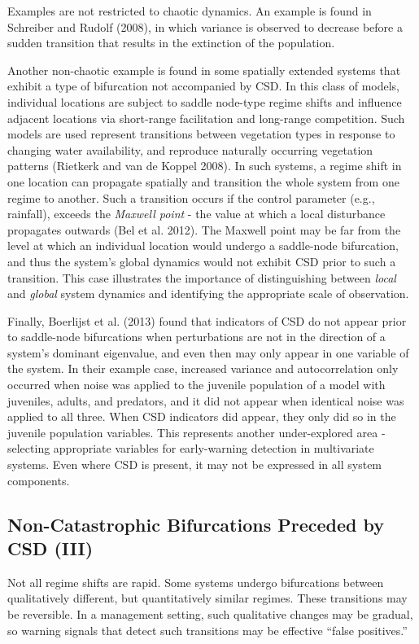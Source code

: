 \documentclass{article}
\begin{document}
Examples are not restricted to chaotic dynamics. An example is found in
Schreiber and Rudolf (2008), in which variance is observed to decrease
before a sudden transition that results in the extinction of the
population.

Another non-chaotic example is found in some spatially extended systems
that exhibit a type of bifurcation not accompanied by CSD. In this class
of models, individual locations are subject to saddle node-type regime
shifts and influence adjacent locations via short-range facilitation and
long-range competition. Such models are used represent transitions
between vegetation types in response to changing water availability, and
reproduce naturally occurring vegetation patterns (Rietkerk and van de
Koppel 2008). In such systems, a regime shift in one location can
propagate spatially and transition the whole system from one regime to
another. Such a transition occurs if the control parameter (e.g.,
rainfall), exceeds the \emph{Maxwell point} - the value at which a local
disturbance propagates outwards (Bel et al. 2012). The Maxwell point may
be far from the level at which an individual location would undergo a
saddle-node bifurcation, and thus the system's global dynamics would not
exhibit CSD prior to such a transition. This case illustrates the
importance of distinguishing between \emph{local} and \emph{global}
system dynamics and identifying the appropriate scale of observation.

Finally, Boerlijst et al. (2013) found that indicators of CSD do not
appear prior to saddle-node bifurcations when perturbations are not in
the direction of a system's dominant eigenvalue, and even then may only
appear in one variable of the system. In their example case, increased
variance and autocorrelation only occurred when noise was applied to the
juvenile population of a model with juveniles, adults, and predators,
and it did not appear when identical noise was applied to all three.
When CSD indicators did appear, they only did so in the juvenile
population variables. This represents another under-explored area -
selecting appropriate variables for early-warning detection in
multivariate systems. Even where CSD is present, it may not be expressed
in all system components.

\subsection{Non-Catastrophic Bifurcations Preceded by CSD (III)}

Not all regime shifts are rapid. Some systems undergo bifurcations
between qualitatively different, but quantitatively similar regimes.
These transitions may be reversible. In a management setting, such
qualitative changes may be gradual, so warning signals that detect such
transitions may be effective ``false positives.''
\end{document}

